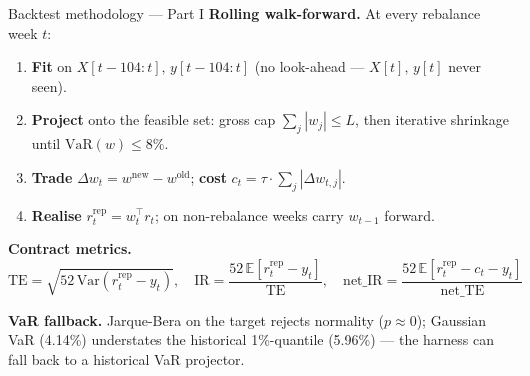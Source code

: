 \documentclass[10pt, aspectratio=169]{beamer}
\begin{document}
\begin{frame}{Backtest methodology --- Part I}
	\textbf{Rolling walk-forward.} At every rebalance week $t$:
	\begin{enumerate}
		\item \textbf{Fit} on $X[t{-}104:t],\, y[t{-}104:t]$ (no look-ahead --- $X[t],\, y[t]$ never seen).
		\item \textbf{Project} onto the feasible set: gross cap $\sum_j |w_j| \le L$, then iterative shrinkage until $\mathrm{VaR}(w) \le 8\%$.
		\item \textbf{Trade} $\Delta w_t = w^{\text{new}} - w^{\text{old}}$; \textbf{cost} $c_t = \tau \cdot \sum_j |\Delta w_{t,j}|$.
		\item \textbf{Realise} $r^{\text{rep}}_t = w_t^\top r_t$; on non-rebalance weeks carry $w_{t-1}$ forward.
	\end{enumerate}

	\smallskip
	\textbf{Contract metrics.}
	\[
		\mathrm{TE} = \sqrt{52\,\mathrm{Var}(r^{\text{rep}}_t - y_t)}, \quad
		\mathrm{IR} = \frac{52\,\mathbb{E}[r^{\text{rep}}_t - y_t]}{\mathrm{TE}}, \quad
		\mathrm{net\_IR} = \frac{52\,\mathbb{E}[r^{\text{rep}}_t - c_t - y_t]}{\mathrm{net\_TE}}
	\]

	\smallskip
	\textbf{VaR fallback.} Jarque-Bera on the target rejects normality ($p \approx 0$); Gaussian VaR (4.14\%) understates the historical 1\%-quantile (5.96\%) --- the harness can fall back to a historical VaR projector.
\end{frame}
\end{document}
